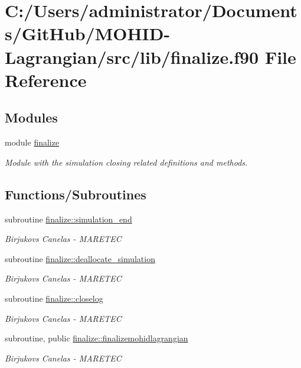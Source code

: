 \hypertarget{finalize_8f90}{}\section{C\+:/\+Users/administrator/\+Documents/\+Git\+Hub/\+M\+O\+H\+I\+D-\/\+Lagrangian/src/lib/finalize.f90 File Reference}
\label{finalize_8f90}
\subsection*{Modules}
\begin{DoxyCompactItemize}
\item 
module \mbox{\hyperlink{namespacefinalize}{finalize}}
\begin{DoxyCompactList}\small\item\em Module with the simulation closing related definitions and methods. \end{DoxyCompactList}\end{DoxyCompactItemize}
\subsection*{Functions/\+Subroutines}
\begin{DoxyCompactItemize}
\item 
subroutine \mbox{\hyperlink{namespacefinalize_a57fbc96712f416103b529ff969479250}{finalize\+::simulation\+\_\+end}}
\begin{DoxyCompactList}\small\item\em Birjukovs Canelas -\/ M\+A\+R\+E\+T\+EC \end{DoxyCompactList}\item 
subroutine \mbox{\hyperlink{namespacefinalize_a2b6733e6db5a768ac96ad9274685ad43}{finalize\+::deallocate\+\_\+simulation}}
\begin{DoxyCompactList}\small\item\em Birjukovs Canelas -\/ M\+A\+R\+E\+T\+EC \end{DoxyCompactList}\item 
subroutine \mbox{\hyperlink{namespacefinalize_ac448631d05fe5daa8739f32c95e89152}{finalize\+::closelog}}
\begin{DoxyCompactList}\small\item\em Birjukovs Canelas -\/ M\+A\+R\+E\+T\+EC \end{DoxyCompactList}\item 
subroutine, public \mbox{\hyperlink{namespacefinalize_a57aceaa0eb3b16c1942dd2cb013010e4}{finalize\+::finalizemohidlagrangian}}
\begin{DoxyCompactList}\small\item\em Birjukovs Canelas -\/ M\+A\+R\+E\+T\+EC \end{DoxyCompactList}\end{DoxyCompactItemize}
